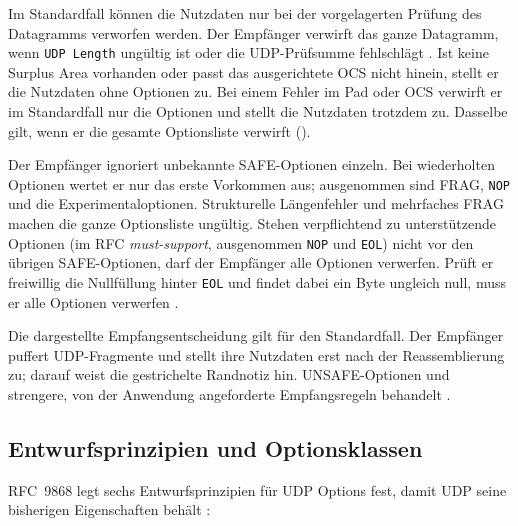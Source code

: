 Im Standardfall können die Nutzdaten nur bei der vorgelagerten Prüfung des Datagramms verworfen werden.
Der Empfänger verwirft das ganze Datagramm, wenn \texttt{UDP Length} ungültig ist oder die UDP-Prüfsumme
fehlschlägt \cite[Sec.~10 und 14]{rfc9868}. Ist keine Surplus Area vorhanden oder passt das ausgerichtete
OCS nicht hinein, stellt er die Nutzdaten ohne Optionen zu. Bei einem Fehler im Pad oder OCS verwirft er
im Standardfall nur die Optionen und stellt die Nutzdaten trotzdem zu. Dasselbe gilt, wenn er die gesamte
Optionsliste verwirft ().

Der Empfänger ignoriert unbekannte SAFE-Optionen einzeln. Bei wiederholten Optionen wertet er nur das
erste Vorkommen aus; ausgenommen sind FRAG, \texttt{NOP} und die Experimentaloptionen. Strukturelle
Längenfehler und mehrfaches FRAG machen die ganze Optionsliste ungültig. Stehen verpflichtend zu
unterstützende Optionen (im RFC \textit{must-support}, ausgenommen \texttt{NOP} und \texttt{EOL}) nicht vor
den übrigen SAFE-Optionen, darf der Empfänger alle Optionen verwerfen. Prüft er freiwillig die Nullfüllung
hinter \texttt{EOL} und findet dabei ein Byte ungleich null, muss er alle Optionen verwerfen
\cite[Sec.~10 und 11.1]{rfc9868}.

Die dargestellte Empfangsentscheidung gilt für den Standardfall. Der Empfänger puffert UDP-Fragmente und
stellt ihre Nutzdaten erst nach der Reassemblierung zu; darauf weist die gestrichelte Randnotiz hin.
UNSAFE-Optionen und strengere, von der Anwendung angeforderte Empfangsregeln behandelt
.

\subsection{Entwurfsprinzipien und Optionsklassen}
\label{subsec:surplus-prinzipien}

RFC~9868 legt sechs Entwurfsprinzipien für UDP Options fest, damit UDP seine bisherigen Eigenschaften behält
\cite[Sec.~6]{rfc9868}:


